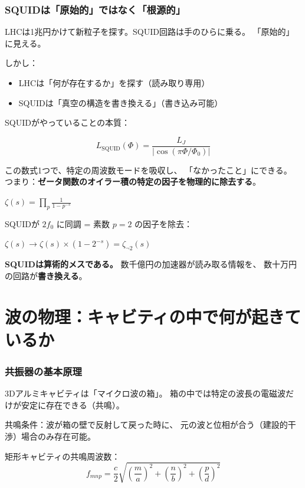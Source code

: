 \documentclass[12pt,a4paper]{article}
\begin{document}
\section{SQUIDは「原始的」ではなく「根源的」}

LHCは1兆円かけて新粒子を探す。SQUID回路は手のひらに乗る。
「原始的」に見える。

しかし：
\begin{itemize}
\item LHCは「何が存在するか」を探す（読み取り専用）
\item SQUIDは「真空の構造を書き換える」（書き込み可能）
\end{itemize}

SQUIDがやっていることの本質：

$$L_{\mathrm{SQUID}}(\Phi) = \frac{L_J}{|\cos(\pi\Phi/\Phi_0)|}$$

この数式1つで、特定の周波数モードを吸収し、
「なかったこと」にできる。
つまり：\textbf{ゼータ関数のオイラー積の特定の因子を物理的に除去する}。

\begin{deepbox}[時空のOS操作]
$\zeta(s) = \prod_p \frac{1}{1-p^{-s}}$

SQUIDが $2f_0$ に同調 = 素数 $p=2$ の因子を除去：

$\zeta(s) \to \zeta(s) \times (1-2^{-s}) = \zeta_{\neg 2}(s)$

\textbf{SQUIDは算術的メスである。}
数千億円の加速器が読み取る情報を、
数十万円の回路が\textbf{書き換える}。
\end{deepbox}

\part{波の物理：キャビティの中で何が起きているか}

\section{共振器の基本原理}

3Dアルミキャビティは「マイクロ波の箱」。
箱の中では特定の波長の電磁波だけが安定に存在できる（共鳴）。

共鳴条件：波が箱の壁で反射して戻った時に、
元の波と位相が合う（建設的干渉）場合のみ存在可能。

矩形キャビティの共鳴周波数：
$$f_{mnp} = \frac{c}{2}\sqrt{\left(\frac{m}{a}\right)^2 + \left(\frac{n}{b}\right)^2 + \left(\frac{p}{d}\right)^2}$$
\end{document}

